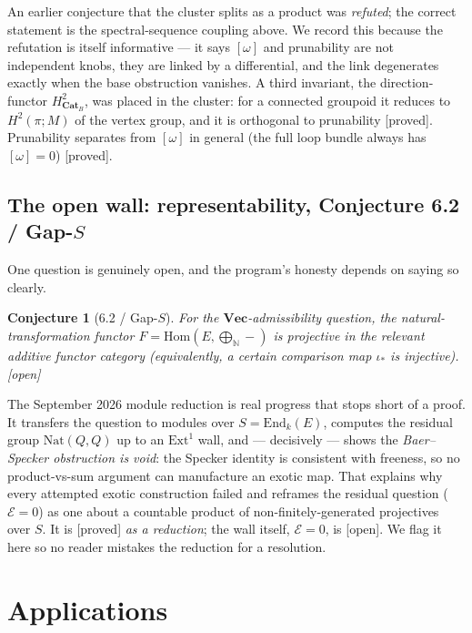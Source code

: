 \documentclass[11pt]{article}
\theoremstyle{plain}
\newtheorem{conjecture}[theorem]{Conjecture}
\theoremstyle{definition}
\theoremstyle{remark}
\newcommand{\Cat}{\mathbf{Cat}}
\renewcommand{\Vec}{\mathbf{Vec}}
\newcommand{\omegacl}{[\omega]}
\newcommand{\HH}[1]{H^{#1}}
\newcommand{\grade}[1]{{\small\textsf{[#1]}}}
\newcommand{\gProved}{\grade{proved}}
\newcommand{\gOpen}{\grade{open}}
\begin{document}
An earlier conjecture that the cluster splits as a product was \emph{refuted}; the correct
statement is the spectral-sequence coupling above. We record this because the refutation is
itself informative --- it says $\omegacl$ and prunability are not independent knobs, they
are linked by a differential, and the link degenerates exactly when the base obstruction
vanishes. A third invariant, the direction-functor $\HH{2}_{\Cat_B}$, was placed in the
cluster: for a connected groupoid it reduces to $\HH{2}(\pi; M)$ of the vertex group, and
it is orthogonal to prunability \gProved{}. Prunability separates from $\omegacl$ in
general (the full loop bundle always has $\omegacl = 0$) \gProved{}.

\subsection{The open wall: representability, Conjecture 6.2 / Gap-$S$}\label{sec:wall}

One question is genuinely open, and the program's honesty depends on saying so clearly.

\begin{conjecture}[6.2 / Gap-$S$]\label{conj:62}
For the $\Vec$-admissibility question, the natural-transformation functor
$F = \mathrm{Hom}(E, \bigoplus_{\mathbb{N}} -)$ is projective in the relevant additive
functor category (equivalently, a certain comparison map $\iota_*$ is injective).
\gOpen{}
\end{conjecture}

The September 2026 module reduction is real progress that stops short of a proof. It
transfers the question to modules over $S = \mathrm{End}_k(E)$, computes the residual
group $\mathrm{Nat}(Q,Q)$ up to an $\mathrm{Ext}^1$ wall, and --- decisively --- shows the
\emph{Baer--Specker obstruction is void}: the Specker identity is consistent with freeness,
so no product-vs-sum argument can manufacture an exotic map. That explains why every
attempted exotic construction failed and reframes the residual question ($\mathcal{E}=0$)
as one about a countable product of non-finitely-generated projectives over $S$. It is
\gProved{} \emph{as a reduction}; the wall itself, $\mathcal{E}=0$, is \gOpen{}. We flag
it here so no reader mistakes the reduction for a resolution.

\section{Applications}\label{sec:applications}
\end{document}
